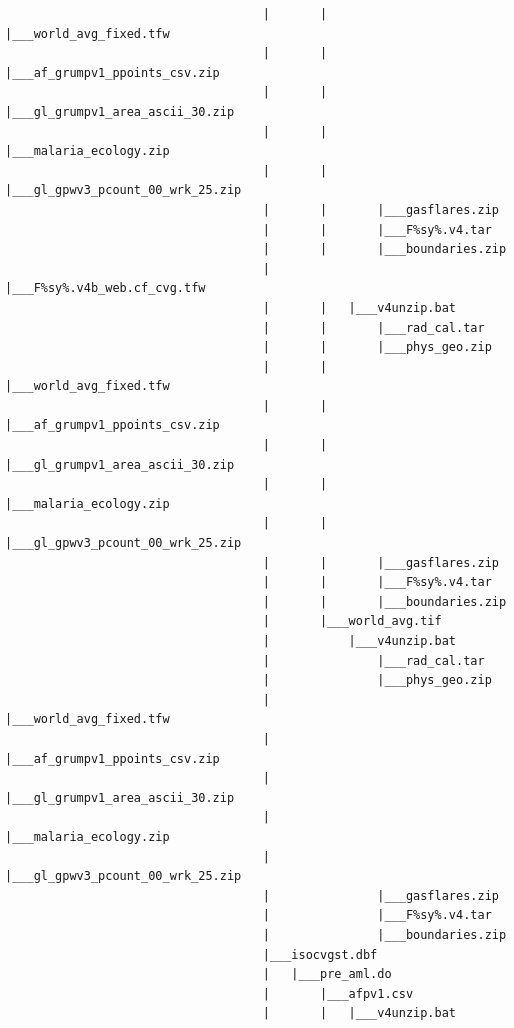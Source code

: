 \documentclass[
]{book}
\begin{document}
\begin{verbatim}
                                    |       |       |___world_avg_fixed.tfw
                                    |       |       |___af_grumpv1_ppoints_csv.zip
                                    |       |       |___gl_grumpv1_area_ascii_30.zip
                                    |       |       |___malaria_ecology.zip
                                    |       |       |___gl_gpwv3_pcount_00_wrk_25.zip
                                    |       |       |___gasflares.zip
                                    |       |       |___F%sy%.v4.tar
                                    |       |       |___boundaries.zip
                                    |       |___F%sy%.v4b_web.cf_cvg.tfw
                                    |       |   |___v4unzip.bat
                                    |       |       |___rad_cal.tar
                                    |       |       |___phys_geo.zip
                                    |       |       |___world_avg_fixed.tfw
                                    |       |       |___af_grumpv1_ppoints_csv.zip
                                    |       |       |___gl_grumpv1_area_ascii_30.zip
                                    |       |       |___malaria_ecology.zip
                                    |       |       |___gl_gpwv3_pcount_00_wrk_25.zip
                                    |       |       |___gasflares.zip
                                    |       |       |___F%sy%.v4.tar
                                    |       |       |___boundaries.zip
                                    |       |___world_avg.tif
                                    |           |___v4unzip.bat
                                    |               |___rad_cal.tar
                                    |               |___phys_geo.zip
                                    |               |___world_avg_fixed.tfw
                                    |               |___af_grumpv1_ppoints_csv.zip
                                    |               |___gl_grumpv1_area_ascii_30.zip
                                    |               |___malaria_ecology.zip
                                    |               |___gl_gpwv3_pcount_00_wrk_25.zip
                                    |               |___gasflares.zip
                                    |               |___F%sy%.v4.tar
                                    |               |___boundaries.zip
                                    |___isocvgst.dbf
                                    |   |___pre_aml.do
                                    |       |___afpv1.csv
                                    |       |   |___v4unzip.bat

\end{verbatim}
\end{document}
